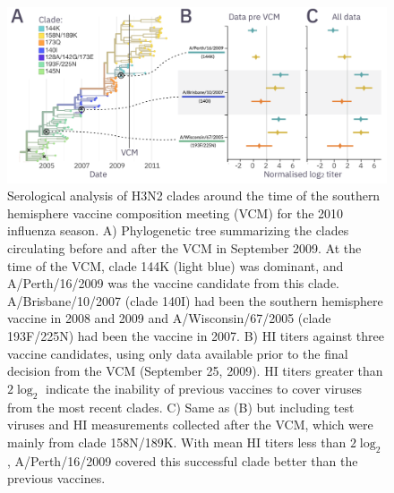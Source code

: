 \documentclass[utf8]{FrontiersinHarvard} %
\begin{document}
\begin{figure}[h!]
  \begin{center}
    \includegraphics[width=\textwidth]{figures/figure-3.png}
  \end{center}
  \caption{
    Serological analysis of H3N2 clades around the time of the southern hemisphere vaccine composition meeting (VCM) for the 2010 influenza season.
    A) Phylogenetic tree summarizing the clades circulating before and after the VCM in September 2009.
    At the time of the VCM, clade 144K (light blue) was dominant, and A/Perth/16/2009 was the vaccine candidate from this clade.
    A/Brisbane/10/2007 (clade 140I) had been the southern hemisphere vaccine in 2008 and 2009 and A/Wisconsin/67/2005 (clade 193F/225N) had been the vaccine in 2007.
    B) HI titers against three vaccine candidates, using only data available prior to the final decision from the VCM (September 25, 2009).
    HI titers greater than $2\log_{2}$ indicate the inability of previous vaccines to cover viruses from the most recent clades.
    C) Same as (B) but including test viruses and HI measurements collected after the VCM, which were mainly from clade 158N/189K.
    With mean HI titers less than $2\log_{2}$, A/Perth/16/2009 covered this successful clade better than the previous vaccines.
  }
  \label{fig:3}
\end{figure}
\end{document}
